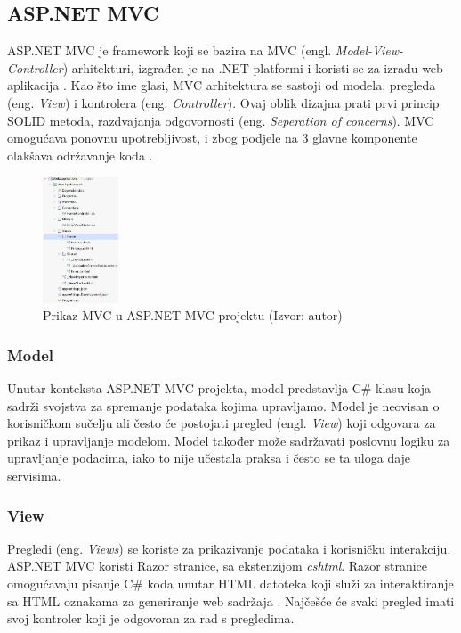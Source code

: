 \documentclass{foi}
\begin{document}
\subsection{ASP.NET MVC}
ASP.NET MVC je framework koji se bazira na MVC (engl. \textit{Model-View-Controller}) arhitekturi, izgrađen je na .NET platformi i koristi se za izradu web aplikacija \cite{Tyler2024}.
Kao što ime glasi, MVC arhitektura se sastoji od modela, pregleda (eng. \textit{View}) i kontrolera (eng. \textit{Controller}). Ovaj oblik dizajna prati prvi princip SOLID metoda, razdvajanja odgovornosti (eng. \textit{Seperation of concerns}).
MVC omogućava ponovnu upotrebljivost, i zbog podjele na 3 glavne komponente olakšava održavanje koda \cite{GeeksforGeeks2024}.
\begin{figure}[H]
    \centering
    \includegraphics[width=0.2\textwidth]{slike/MVC_project.jpeg}
    \caption{Prikaz MVC u ASP.NET MVC projektu (Izvor: autor)}
    \label{fig:mvc_projekt}
\end{figure}

\subsubsection{Model}
Unutar konteksta ASP.NET MVC projekta, model predstavlja C\# klasu koja sadrži svojstva za spremanje podataka kojima upravljamo. Model je neovisan o korisničkom sučelju ali često će postojati pregled (engl. \textit{View}) koji odgovara za prikaz i upravljanje modelom.
Model također može sadržavati poslovnu logiku za upravljanje podacima, iako to nije učestala praksa i često se ta uloga daje servisima.
\subsubsection{View}
Pregledi (eng. \textit{Views}) se koriste za prikazivanje podataka i korisničku interakciju. ASP.NET MVC koristi Razor stranice, sa ekstenzijom \textit{cshtml}. Razor stranice omogućavaju pisanje C\# koda unutar HTML datoteka koji služi za interaktiranje sa HTML oznakama za generiranje web sadržaja \cite{Smith2022}. Najčešće će svaki pregled imati svoj kontroler koji je odgovoran za rad s pregledima.
\end{document}
